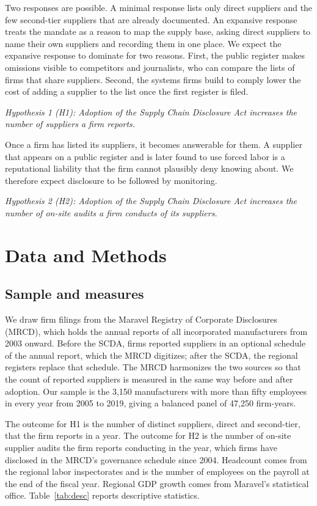 \documentclass[11pt]{article}
\begin{document}
Two responses are possible. A minimal response lists only direct suppliers and the few second-tier suppliers that are already documented. An expansive response treats the mandate as a reason to map the supply base, asking direct suppliers to name their own suppliers and recording them in one place. We expect the expansive response to dominate for two reasons. First, the public register makes omissions visible to competitors and journalists, who can compare the lists of firms that share suppliers. Second, the systems firms build to comply lower the cost of adding a supplier to the list once the first register is filed.

\textit{Hypothesis 1 (H1): Adoption of the Supply Chain Disclosure Act increases the number of suppliers a firm reports.}

Once a firm has listed its suppliers, it becomes answerable for them. A supplier that appears on a public register and is later found to use forced labor is a reputational liability that the firm cannot plausibly deny knowing about. We therefore expect disclosure to be followed by monitoring.

\textit{Hypothesis 2 (H2): Adoption of the Supply Chain Disclosure Act increases the number of on-site audits a firm conducts of its suppliers.}

\section{Data and Methods}

\subsection{Sample and measures}

We draw firm filings from the Maravel Registry of Corporate Disclosures (MRCD), which holds the annual reports of all incorporated manufacturers from 2003 onward. Before the SCDA, firms reported suppliers in an optional schedule of the annual report, which the MRCD digitizes; after the SCDA, the regional registers replace that schedule. The MRCD harmonizes the two sources so that the count of reported suppliers is measured in the same way before and after adoption. Our sample is the 3,150 manufacturers with more than fifty employees in every year from 2005 to 2019, giving a balanced panel of 47,250 firm-years.

The outcome for H1 is the number of distinct suppliers, direct and second-tier, that the firm reports in a year. The outcome for H2 is the number of on-site supplier audits the firm reports conducting in the year, which firms have disclosed in the MRCD's governance schedule since 2004. Headcount comes from the regional labor inspectorates and is the number of employees on the payroll at the end of the fiscal year. Regional GDP growth comes from Maravel's statistical office. Table~\ref{tab:desc} reports descriptive statistics.
\end{document}

